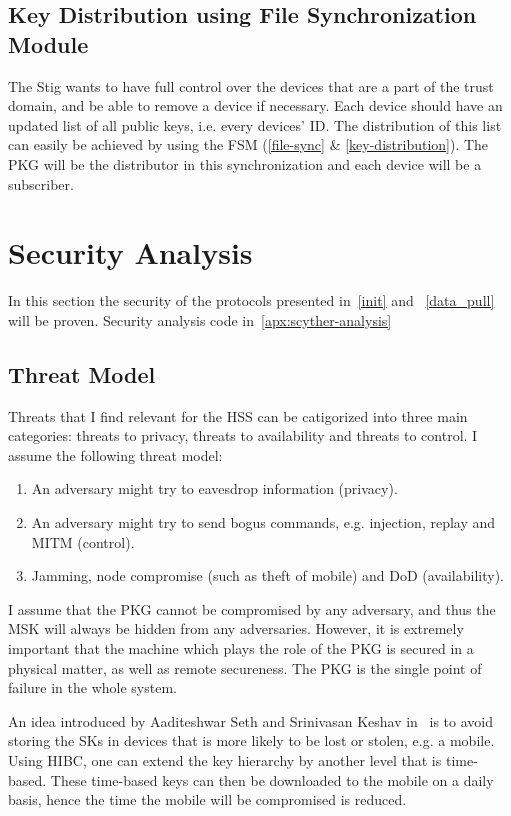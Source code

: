 
\subsection{Key Distribution using File Synchronization Module}

The Stig wants to have full control over the devices that are a part of the trust domain, and be able to remove a device if necessary.
Each device should have an updated list of all public keys, i.e. every devices' \gls{ID}.
The distribution of this list can easily be achieved by using the \gls{FSM} (\autoref{file-sync} \& \autoref{key-distribution}).
The \gls{PKG} will be the distributor in this synchronization and each device will be a subscriber.


\section{Security Analysis}
In this section the security of the protocols presented in~\autoref{init} and ~\autoref{data_pull} will be proven.
\todo{!!}
Security analysis code in~\autoref{apx:scyther-analysis}

\subsection{Threat Model}
Threats that I find relevant for the \gls{HSS} can be catigorized into three main categories: threats to privacy, threats to availability and threats to control.
I assume the following threat model:
\begin{enumerate}
  \item An adversary might try to eavesdrop information (privacy).
  \item An adversary might try to send bogus commands, e.g. injection, replay and \gls{MITM} (control).
  \item Jamming, node compromise (such as theft of mobile) and \gls{DoD} (availability).
\end{enumerate}

I assume that the \gls{PKG} cannot be compromised by any adversary, and thus the \gls{MSK} will always be hidden from any adversaries. 
However, it is extremely important that the machine which plays the role of the \gls{PKG} is secured in a physical matter, as well as remote secureness. 
The \gls{PKG} is the single point of failure in the whole system.

An idea introduced by Aaditeshwar Seth and Srinivasan Keshav in~\cite[Section 5.4]{Seth:2005:PSD:1897159.1897165} is to avoid storing the \gls{SK}s in devices that is more likely to be lost or stolen, e.g. a mobile.
Using \gls{HIBC}, one can extend the key hierarchy by another level that is time-based.
These time-based keys can then be downloaded to the mobile on a daily basis, hence the time the mobile will be compromised is reduced.

